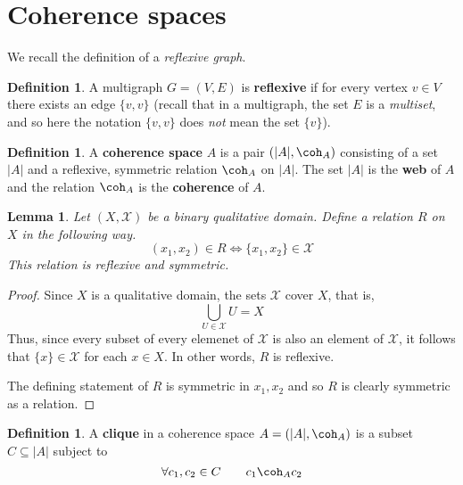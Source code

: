 \documentclass[12pt]{article}
\theoremstyle{plain}
\newtheorem{lemma}[thm]{Lemma}
\theoremstyle{definition}
\newtheorem{defn}[thm]{Definition} %
\newcommand{\scr}[1]{\mathscr{#1}}
\begin{document}
	\section{Coherence spaces}
	We recall the definition of a \emph{reflexive graph}.
	\begin{defn}
		A multigraph $G = (V,E)$ is \textbf{reflexive} if for every vertex $v \in V$ there exists an edge $\{ v, v \}$ (recall that in a multigraph, the set $E$ is a \emph{multiset}, and so here the notation $\{ v,v\}$ does \emph{not} mean the set $\{ v\}$).
		\end{defn}
	\begin{defn}
		A \textbf{coherence space} $A$ is a pair $(|A|, \coh_A)$ consisting of a set $|A|$ and a reflexive, symmetric relation $\coh_A$ on $|A|$. The set $|A|$ is the \textbf{web} of $A$ and the relation $\coh_A$ is the \textbf{coherence} of $A$.
		\end{defn}
	
	\begin{lemma}
		Let $(X, \scr{X})$ be a binary qualitative domain. Define a relation $R$ on $X$ in the following way.
		\begin{equation}
			(x_1,x_2) \in R \Leftrightarrow \{ x_1, x_2 \} \in \scr{X}
			\end{equation}
		This relation is reflexive and symmetric.
		\end{lemma}
	\begin{proof}
		Since $X$ is a qualitative domain, the sets $\scr{X}$ cover $X$, that is,
		\begin{equation}
			\bigcup_{U \in \scr{X}}U = X
			\end{equation}
		Thus, since every subset of every elemenet of $\scr{X}$ is also an element of $\scr{X}$, it follows that $\{ x \} \in \scr{X}$ for each $x \in X$. In other words, $R$ is reflexive.
		
		The defining statement of $R$ is symmetric in $x_1, x_2$ and so $R$ is clearly symmetric as a relation.
		\end{proof}
	
	\begin{defn}
		A \textbf{clique} in a coherence space $A = (|A|, \coh_A)$ is a subset $C \subseteq |A|$ subject to
		\begin{equation}
			\forall c_1, c_2 \in C\qquad c_1 \coh_A c_2
			\end{equation}
		\end{defn}
	
\end{document}
